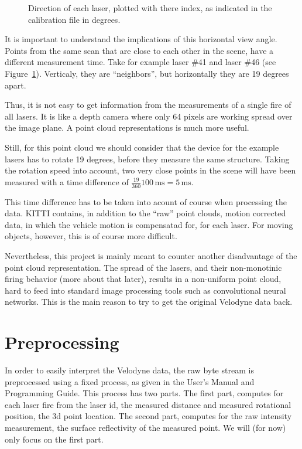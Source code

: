 \documentclass[english]{article}
\begin{document}
\begin{figure}
    \centering
    \def\svgwidth{\columnwidth}
    \scalebox{0.9}{
    \def\svgwidth{.6 \columnwidth}
      
    }
    \caption{Direction of each laser, plotted with there index, as
    indicated in the calibration file in degrees.}
		\label{fig:directions}
\end{figure}

It is important to understand the implications of this horizontal view
angle. Points from the same scan that are close to each other in the
scene, have a different measurement time. Take for example laser \#41
and laser \#46 (see Figure~\ref{fig:directions}). Verticaly, they are
``neighbors'', but horizontally they are 19 degrees apart.

Thus, it is not easy to get information from the measurements of a
single fire of all lasers. It is like a depth camera where only 64
pixels are working spread over the image plane. A point cloud
representations is much more useful.

Still, for this point cloud we should consider that the device for the
example lasers has to rotate 19 degrees, before they measure the same
structure. Taking the rotation speed into account, two very close points
in the scene will have been measured with a time difference of
$\frac{19}{360} 100 \, \mbox{ms}= 5 \, \mbox{ms}$.

This time difference has to be taken into acount of course when
processing the data. KITTI contains, in addition to the ``raw'' point
clouds, motion corrected data, in which the vehicle motion is
compensatad for, for each laser. For moving objects, however, this is of
course more difficult.

Nevertheless, this project is mainly meant to counter another
disadvantage of the point cloud representation. The spread of the
lasers, and their non-monotinic firing behavior (more about that later),
results in a non-uniform point cloud, hard to feed into standard image
processing tools such as convolutional neural networks. This is the main
reason to try to get the original Velodyne data back.

\section{Preprocessing}
\label{sec:preproc}
In order to easily interpret the Velodyne data, the raw byte stream is
preprocessed using a fixed process, as given in the User's Manual and
Programming Guide. This process has two parts. The first part, computes for
each laser fire from the laser id, the measured distance and measured
rotational position, the 3d point location. The second part, computes
for the raw intensity measurement, the surface reflectivity of the
measured point. We will (for now) only focus on the first part.
\end{document}
